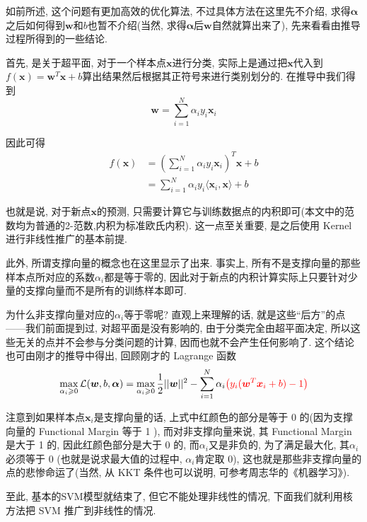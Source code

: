 \documentclass[a4paper,UTF8]{ctexart}
\theoremstyle{plain} \newtheorem{theorem}{定理}[section]
\theoremstyle{plain} \newtheorem{definition}{定义}[section]
\theoremstyle{plain} \newtheorem{lemma}{引理}[section]
\theoremstyle{plain} \newtheorem{proposition}{命题}[section]
\theoremstyle{plain} \newtheorem{example}{例}
\theoremstyle{plain} \newtheorem{remark}{注}
\theoremstyle{plain} \newtheorem{corollary}{推论}[section]
\begin{document}
如前所述, 这个问题有更加高效的优化算法, 不过具体方法在这里先不介绍, 求得$\bm{\alpha}$之后如何得到$\bm{w}$和$b$也暂不介绍(当然, 求得$\bm{\alpha}$后$\bm{w}$自然就算出来了), 先来看看由推导过程所得到的一些结论.

首先, 是关于超平面, 对于一个样本点$\bm{x}$进行分类, 实际上是通过把$\bm{x}$代入到$f(\bm{x}) = \bm{w}^{T} \bm{x} + b$算出结果然后根据其正符号来进行类别划分的. 在推导中我们得到
\begin{equation*}
\bm{w} = \sum_{i=1}^{N} \alpha_{i} y_{i} \bm{x}_{i}
\end{equation*}

因此可得
\begin{align*}
f(\bm{x}) & = \left( \sum_{i=1}^{N} \alpha_{i} y_{i} \bm{x}_{i} \right)^{T} \bm{x} + b \\ 
& = \sum_{i=1}^{N} \alpha_{i} y_{i} \langle \bm{x}_{i}, \bm{x} \rangle + b
\end{align*}

也就是说, 对于新点$\bm{x}$的预测, 只需要计算它与训练数据点的内积即可(本文中的范数均为普通的2-范数,内积为标准欧氏内积). 这一点至关重要, 是之后使用 Kernel 进行非线性推广的基本前提.

此外, 所谓支撑向量的概念也在这里显示了出来. 事实上, 所有不是支撑向量的那些样本点所对应的系数$\alpha_{i}$都是等于零的, 因此对于新点的内积计算实际上只要针对少量的支撑向量而不是所有的训练样本即可.

为什么非支撑向量对应的$\alpha_{i}$等于零呢? 直观上来理解的话, 就是这些“后方”的点——我们前面提到过, 对超平面是没有影响的, 由于分类完全由超平面决定, 所以这些无关的点并不会参与分类问题的计算, 因而也就不会产生任何影响了. 这个结论也可由刚才的推导中得出, 回顾刚才的 Lagrange 函数
\begin{equation*}
\max_{\alpha_{i} \geqslant 0} \mathcal{L} (\bm{w},b,\bm{\alpha}) = \max _{\alpha_{i} \geqslant 0} \frac{1}{2} ||\bm{w}||^{2} - \sum_{i=1}^{N} \alpha_{i} {\color{red}\left( y_{i} (\bm{w}^{T} \bm{x}_{i} + b) - 1 \right)}
\end{equation*}

注意到如果样本点$\bm{x}_{i}$是支撑向量的话, 上式中红颜色的部分是等于 0 的(因为支撑向量的 Functional Margin 等于 1 ), 而对非支撑向量来说, 其 Functional Margin 是大于 1 的, 因此红颜色部分是大于 0 的, 而$\alpha_{i}$又是非负的, 为了满足最大化, 其$\alpha_{i}$必须等于 0 (也就是说求最大值的过程中, $\alpha_{i}$肯定取 0), 这也就是那些非支撑向量的点的悲惨命运了(当然, 从 KKT 条件也可以说明, 可参考周志华的《机器学习》).

至此, 基本的SVM模型就结束了, 但它不能处理非线性的情况, 下面我们就利用核方法把 SVM 推广到非线性的情况.
\end{document}

